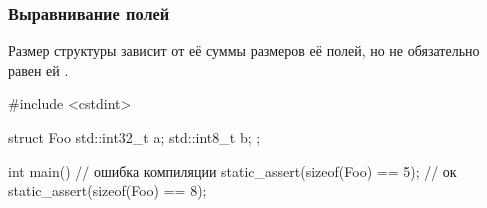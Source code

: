 \documentclass[compress, 8pt, aspectratio=169]{beamer}
\begin{document}
\begin{frame}[fragile]

    \frametitle{Выравнивание полей}

    Размер структуры зависит от её суммы размеров её полей, но не обязательно равен ей
    \footnotemark{}.

    \begin{myinplacelisting}[minted language=cpp]
#include <cstdint>

struct Foo {
    std::int32_t a;
    std::int8_t b;
};

int main() {
    // ошибка компиляции
    static_assert(sizeof(Foo) == 5);
    // ок
    static_assert(sizeof(Foo) == 8);
}
    \end{myinplacelisting}


\end{frame}
\end{document}

